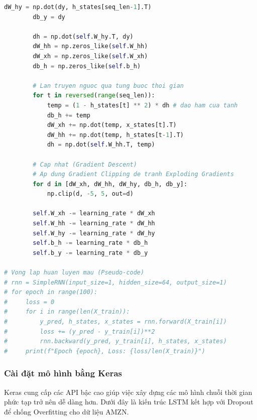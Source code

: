 \begin{lstlisting}[language=Python, caption=Cài đặt RNN từ đầu với NumPy cho tập dữ liệu AMZN]
        dW_hy = np.dot(dy, h_states[seq_len-1].T)
        db_y = dy
        
        dh = np.dot(self.W_hy.T, dy)
        dW_hh = np.zeros_like(self.W_hh)
        dW_xh = np.zeros_like(self.W_xh)
        db_h = np.zeros_like(self.b_h)
        
        # Lan truyen nguoc qua tung buoc thoi gian
        for t in reversed(range(seq_len)):
            temp = (1 - h_states[t] ** 2) * dh # dao ham cua tanh
            db_h += temp
            dW_xh += np.dot(temp, x_states[t].T)
            dW_hh += np.dot(temp, h_states[t-1].T)
            dh = np.dot(self.W_hh.T, temp)
            
        # Cap nhat (Gradient Descent)
        # Ap dung Gradient Clipping de tranh Exploding Gradients
        for d in [dW_xh, dW_hh, dW_hy, db_h, db_y]:
            np.clip(d, -5, 5, out=d)
            
        self.W_xh -= learning_rate * dW_xh
        self.W_hh -= learning_rate * dW_hh
        self.W_hy -= learning_rate * dW_hy
        self.b_h -= learning_rate * db_h
        self.b_y -= learning_rate * db_y
        
# Vong lap huan luyen mau (Pseudo-code)
# rnn = SimpleRNN(input_size=1, hidden_size=64, output_size=1)
# for epoch in range(100):
#     loss = 0
#     for i in range(len(X_train)):
#         y_pred, h_states, x_states = rnn.forward(X_train[i])
#         loss += (y_pred - y_train[i])**2
#         rnn.backward(y_pred, y_train[i], h_states, x_states)
#     print(f"Epoch {epoch}, Loss: {loss/len(X_train)}")
\end{lstlisting}

\subsubsection{Cài đặt mô hình bằng Keras}
Keras cung cấp các API bậc cao giúp việc xây dựng các mô hình chuỗi thời gian phức tạp trở nên dễ dàng hơn. Dưới đây là kiến trúc LSTM kết hợp với Dropout để chống Overfitting cho dữ liệu AMZN.


